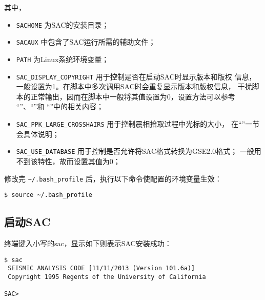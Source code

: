 其中，
\begin{itemize}
\item \texttt{SACHOME} 为SAC的安装目录；
\item \texttt{SACAUX} 中包含了SAC运行所需的辅助文件；
\item \texttt{PATH} 为Linux系统环境变量；
\item \verb|SAC_DISPLAY_COPYRIGHT| 用于控制是否在启动SAC时显示版本和版权
    信息，一般设置为1。在脚本中多次调用SAC时会重复显示版本和版权信息，
    干扰脚本的正常输出，因而在脚本中一般将其值设置为0，设置方法可以参考
    ``''、``''和
    ``''中的相关内容；
\item \verb|SAC_PPK_LARGE_CROSSHAIRS| 用于控制震相拾取过程中光标的大小，
    在``''一节会具体说明；
\item \verb|SAC_USE_DATABASE| 用于控制是否允许将SAC格式转换为GSE2.0格式；
    一般用不到该特性，故而设置其值为0；
\end{itemize}

修改完 \verb|~/.bash_profile| 后，执行以下命令使配置的环境变量生效：
\begin{verbatim}
$ source ~/.bash_profile
\end{verbatim}

\subsection{启动SAC}
终端键入小写的sac，显示如下则表示SAC安装成功：
\begin{verbatim}
$ sac
 SEISMIC ANALYSIS CODE [11/11/2013 (Version 101.6a)]
 Copyright 1995 Regents of the University of California

SAC>
\end{verbatim}
